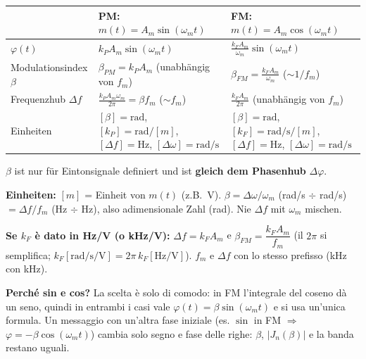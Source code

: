 {\renewcommand{\arraystretch}{2.1}
\begin{tabularx}{\linewidth}{|>{\raggedright\arraybackslash}p{.24\linewidth}|>{\centering\arraybackslash}X|>{\centering\arraybackslash}X|}
	\hline
	& \textbf{PM:} $m(t) = A_m\sin(\omega_m t)$ & \textbf{FM:} $m(t) = A_m\cos(\omega_m t)$ \\ \hline
	$\varphi(t)$ & $k_P A_m \sin(\omega_m t)$ & $\displaystyle \frac{k_F A_m}{\omega_m}\sin(\omega_m t)$ \\ \hline
	Modulationsindex $\beta$ & $\beta_{PM} = k_P A_m$ \quad (unabhängig von $f_m$) & $\displaystyle \beta_{FM} = \frac{k_F A_m}{\omega_m}$ \quad ($\sim 1/f_m$) \\ \hline
	Frequenzhub $\Delta f$ & $\displaystyle \frac{k_P A_m \omega_m}{2\pi} = \beta f_m$ \quad ($\sim f_m$) & $\displaystyle \frac{k_F A_m}{2\pi}$ \quad (unabhängig von $f_m$) \\ \hline
	Einheiten & $[\beta]=\mathrm{rad}$, \; $[k_P]=\mathrm{rad}/[m]$, \; $[\Delta f]=\mathrm{Hz}$, \; $[\Delta\omega]=\mathrm{rad/s}$ & $[\beta]=\mathrm{rad}$, \; $[k_F]=\mathrm{rad/s}/[m]$, \; $[\Delta f]=\mathrm{Hz}$, \; $[\Delta\omega]=\mathrm{rad/s}$ \\ \hline
\end{tabularx}}

\vspace{.2cm}
$\beta$ ist nur für Eintonsignale definiert und ist \textbf{gleich dem Phasenhub} $\Delta\varphi$.

\textbf{Einheiten:} $[m]$ = Einheit von $m(t)$ (z.B.\ V). $\beta=\Delta\omega/\omega_m$ (rad/s $\div$ rad/s) $=\Delta f/f_m$ (Hz $\div$ Hz), also adimensionale Zahl (rad). Nie $\Delta f$ mit $\omega_m$ mischen.

\textbf{Se $k_F$ è dato in Hz/V (o kHz/V):} $\Delta f = k_F A_m$ e $\beta_{FM}=\dfrac{k_F A_m}{f_m}$ (il $2\pi$ si semplifica; $k_F[\mathrm{rad/s/V}]=2\pi\,k_F[\mathrm{Hz/V}]$). $f_m$ e $\Delta f$ con lo stesso prefisso (kHz con kHz).

\textbf{Perché sin e cos?} La scelta è solo di comodo: in FM l'integrale del coseno dà un seno, quindi in entrambi i casi vale $\varphi(t)=\beta\sin(\omega_m t)$ e si usa un'unica formula. Un messaggio con un'altra fase iniziale (es. $\sin$ in FM $\Rightarrow$ $\varphi=-\beta\cos(\omega_m t)$) cambia solo segno e fase delle righe: $\beta$, $|J_n(\beta)|$ e la banda restano uguali.

